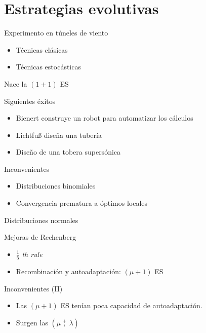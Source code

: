 \documentclass[10pt]{beamer}
\begin{document}
\section{Estrategias evolutivas}

\begin{frame}{Experimento en túneles de viento}
  \begin{itemize}\itemsep2pt
  \item Técnicas clásicas
  \item Técnicas estocásticas
  \end{itemize}

  \begin{center}
    Nace la $(1 + 1)$ ES
  \end{center}
\end{frame}

\begin{frame}{Siguientes éxitos}
  \begin{itemize}\itemsep2pt
  \item Bienert construye un robot para automatizar los cálculos
  \item Lichtfu{\ss} diseña una tubería
  \item Diseño de una tobera supersónica
  \end{itemize}
\end{frame}

\begin{frame}{Inconvenientes}
  \begin{itemize}\itemsep2pt
  \item Distribuciones binomiales
  \item Convergencia prematura a óptimos locales
  \end{itemize}

  \begin{center}
    Distribuciones normales
  \end{center}
\end{frame}

\begin{frame}{Mejoras de Rechenberg}
  \begin{itemize}\itemsep2pt
  \item $\frac{1}{5}$ \emph{th rule}
  \item Recombinación y autoadaptación: $(\mu + 1)$ ES
  \end{itemize}
\end{frame}

\begin{frame}{Inconvenientes (II)}
  \begin{itemize}[<+- | alert@+>]
  \item Las $(\mu + 1)$ ES tenían poca capacidad de autoadaptación.
  \item Surgen las $\left( \mu \ \overset{+}{,} \ \lambda \right)$
  \end{itemize}
\end{frame}
\end{document}
